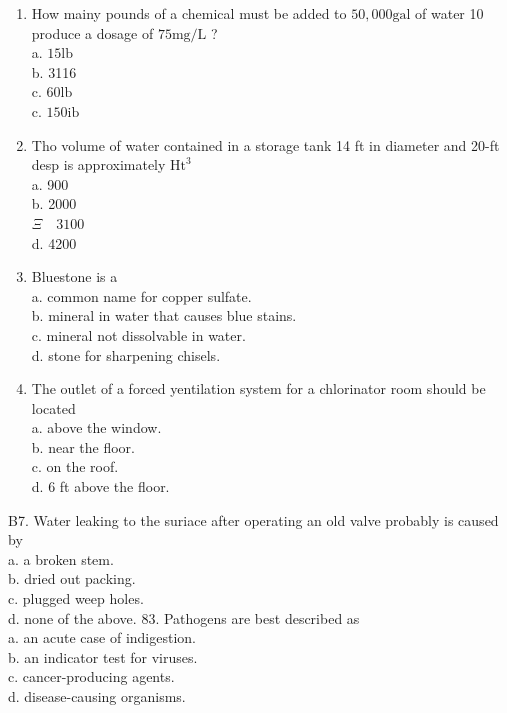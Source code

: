 \documentclass[10pt]{article}
\begin{document}
\begin{enumerate}
  \item How mainy pounds of a chemical must be added to $50,000 \mathrm{gal}$ of water 10 produce a dosage of $75 \mathrm{mg} / \mathrm{L}$ ?\\
a. $15 \mathrm{lb}$\\
b. 3116\\
c. $60 \mathrm{lb}$\\
c. $150 \mathrm{ib}$

  \item Tho volume of water contained in a storage tank 14 ft in diameter and 20-ft desp is approximately $\mathrm{Ht}^{3}$\\
a. 900\\
b. 2000\\
$\Xi \quad 3100$\\
d. 4200

  \item Bluestone is a\\
a. common name for copper sulfate.\\
b. mineral in water that causes blue stains.\\
c. mineral not dissolvable in water.\\
d. stone for sharpening chisels.

  \item The outlet of a forced yentilation system for a chlorinator room should be located\\
a. above the window.\\
b. near the floor.\\
c. on the roof.\\
d. 6 ft above the floor.

\end{enumerate}

B7. Water leaking to the suriace after operating an old valve probably is caused by\\
a. a broken stem.\\
b. dried out packing.\\
c. plugged weep holes.\\
d. none of the above. 83. Pathogens are best described as\\
a. an acute case of indigestion.\\
b. an indicator test for viruses.\\
c. cancer-producing agents.\\
d. disease-causing organisms.
\end{document}
